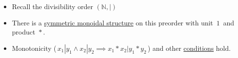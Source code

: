 \begin{itemize}
    \item Recall the divisibility order $(\mathbb{N}, |)$
    \item There is a \href{doc/1 math/Seven Sketches in Compositionality/Chapter 2: Resource theories/2 Symmetric monoidal preorders/1 Definition and first examples/1 Symmetric monoidal structure on a preorder}{symmetric monoidal structure} on this preorder with unit \,$1$\, and product \,$*$\,.
    \item  Monotonicity (\,$x_1|y_1 \land x_2|y_2 \implies x_1*x_2 | y_1*y_2$\,) and other \href{doc/1 math/Seven Sketches in Compositionality/Chapter 2: Resource theories/2 Symmetric monoidal preorders/1 Definition and first examples/1 Symmetric monoidal structure on a preorder}{conditions} hold.  \end{itemize}
